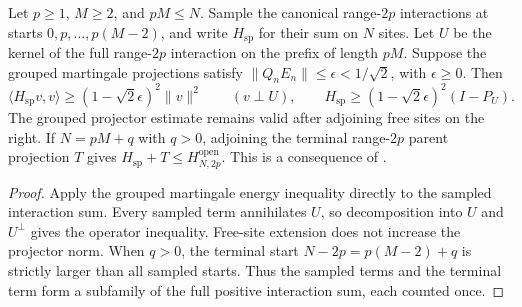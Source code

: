 \begin{lemma}
    \label{thm:sparse_grouped_open_energy_gap}
    \leanok
    Let $p\geq1$, $M\geq2$, and $pM\leq N$. Sample the canonical
    range-$2p$ interactions at starts $0,p,\ldots,p(M-2)$, and write
    $H_{\mathrm{sp}}$ for their sum on $N$ sites. Let $U$ be the kernel
    of the full range-$2p$ interaction on the prefix of length $pM$.
    Suppose the grouped martingale projections satisfy
    $\|Q_nE_n\|\leq\epsilon<1/\sqrt2$, with $\epsilon\geq0$.
    Then
    \[
        \langle H_{\mathrm{sp}}v,v\rangle
        \geq(1-\sqrt2\epsilon)^2\|v\|^2
        \qquad(v\perp U),
        \qquad
        H_{\mathrm{sp}}\geq(1-\sqrt2\epsilon)^2(I-P_U).
    \]
    The grouped projector estimate remains valid after adjoining free
    sites on the right. If $N=pM+q$ with $q>0$, adjoining the terminal
    range-$2p$ parent projection $T$ gives
    $H_{\mathrm{sp}}+T\leq H^{\mathrm{open}}_{N,2p}$.
    This is a consequence of
    \cite[Theorem~2.1(ii)]{Nachtergaele1996Spectral}.
\end{lemma}
\begin{proof}\leanok
    Apply the grouped martingale energy inequality directly to the sampled
    interaction sum. Every sampled term annihilates $U$, so decomposition
    into $U$ and $U^\perp$ gives the operator inequality. Free-site extension
    does not increase the projector norm. When $q>0$, the terminal start
    $N-2p=p(M-2)+q$ is strictly larger than all sampled starts. Thus the
    sampled terms and the terminal term form a subfamily of the full
    positive interaction sum, each counted once.
\end{proof}

